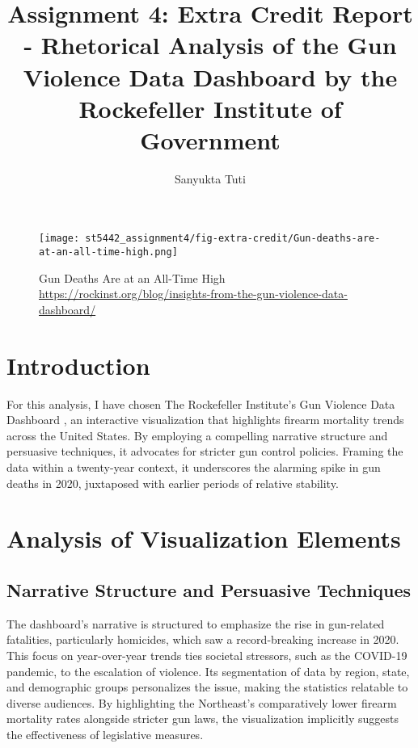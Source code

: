 \documentclass{article}
\title{Assignment 4: Extra Credit Report - Rhetorical Analysis of the Gun Violence Data Dashboard by the Rockefeller Institute of Government
}
\author{Sanyukta Tuti}
\begin{document}
  \maketitle %
  \thispagestyle{empty}

\begin{figure}[ht] %
    \centering
    \texttt{[image: st5442\_assignment4/fig-extra-credit/Gun-deaths-are-at-an-all-time-high.png]}
    \caption{
        Gun Deaths Are at an All-Time High \url{https://rockinst.org/blog/insights-from-the-gun-violence-data-dashboard/}
    }
    \label{fig:fig1}
\end{figure}

\section{Introduction}

For this analysis, I have chosen The Rockefeller Institute's Gun Violence Data Dashboard \cite{gun_violence_dashboard}, an interactive visualization that highlights firearm mortality trends across the United States. By employing a compelling narrative structure and persuasive techniques, it advocates for stricter gun control policies. Framing the data within a twenty-year context, it underscores the alarming spike in gun deaths in 2020, juxtaposed with earlier periods of relative stability.

\section{Analysis of Visualization Elements}

\subsection{Narrative Structure and Persuasive Techniques}

The dashboard's narrative is structured to emphasize the rise in gun-related fatalities, particularly homicides, which saw a record-breaking increase in 2020. This focus on year-over-year trends ties societal stressors, such as the COVID-19 pandemic, to the escalation of violence. Its segmentation of data by region, state, and demographic groups personalizes the issue, making the statistics relatable to diverse audiences. By highlighting the Northeast’s comparatively lower firearm mortality rates alongside stricter gun laws, the visualization implicitly suggests the effectiveness of legislative measures.
\end{document}
